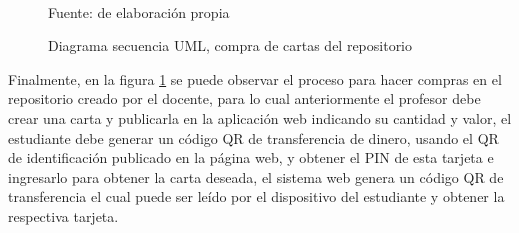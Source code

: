 \begin{figure}[!htb]
\caption{Diagrama secuencia UML, compra de cartas del repositorio}
\label{img:UMLcompra}
\centering
\begin{adjustbox}{width=8cm}
\end{adjustbox}
\\
{\footnotesize Fuente: de elaboración propia}
\end{figure}

Finalmente, en la figura \ref{img:UMLcompra} se puede observar el proceso para hacer compras en el repositorio 
creado por el docente, para lo cual anteriormente el profesor debe crear una carta y publicarla en la 
aplicación web indicando su cantidad y valor, el estudiante debe generar un código QR de transferencia de 
dinero, usando el QR de identificación publicado en la página web, y obtener el PIN de esta tarjeta e 
ingresarlo para obtener la carta deseada, el sistema web genera un código QR de transferencia el cual puede 
ser leído por el dispositivo del estudiante y obtener la respectiva tarjeta.

